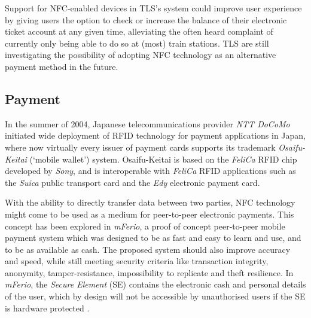 Support for NFC-enabled devices in TLS's system could improve user experience by giving users the option to check or increase the balance of their electronic ticket account at any given time, alleviating the often heard complaint of currently only being able to do so at (most) train stations.
TLS are still investigating the possibility of adopting NFC technology as an alternative payment method in the future. \cite{OVchipkaart} %



\subsection{Payment}
In the summer of 2004, Japanese telecommunications provider \textit{NTT DoCoMo} initiated wide deployment of RFID technology for payment applications in Japan, where now virtually every issuer of payment cards supports its trademark \textit{Osaifu-Keitai} (`mobile wallet') system.
Osaifu-Keitai is based on the \textit{FeliCa} RFID chip developed by \textit{Sony}, and is interoperable with \textit{FeliCa} RFID applications such as the \textit{Suica} public transport card and the \textit{Edy} electronic payment card.
\cite{yamauchi2006intensive}


With the ability to directly transfer data between two parties, NFC technology might come to be used as a medium for peer-to-peer electronic payments.
This concept has been explored in \textit{mFerio}, a proof of concept peer-to-peer mobile payment system which was designed to be as fast and easy to learn and use, and to be as available as cash.
The proposed system should also improve accuracy and speed, while still meeting security criteria like transaction integrity, anonymity, tamper-resistance, impossibility to replicate and theft resilience. 
In \textit{mFerio}, the \textit{Secure Element} (SE) contains the electronic cash and personal details of the user, which by design will not be accessible by unauthorised users if the SE is hardware protected \cite{1555846}.


